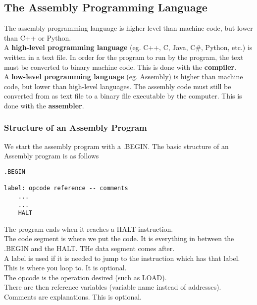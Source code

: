 \documentclass[]{article}
\begin{document}
\subsection{The Assembly Programming Language}
\bigbreak

The assembly programming language is higher level than machine code, but lower than C++ or Python.\\

A \textbf{high-level programming language} (eg. C++, C, Java, C\#, Python, etc.) is written in a text file. In order for the program to run by the program, the text must be converted to binary machine code. This is done with the \textbf{compiler}.\\

A \textbf{low-level programming language} (eg. Assembly) is higher than machine code, but lower than high-level languages. The assembly code must still be converted from as text file to a binary file executable by the computer. This is done with the \textbf{assembler}.\\

\subsubsection{Structure of an Assembly Program}
\bigbreak

We start the assembly program with a .BEGIN. The basic structure of an Assembly program is as follows  \\

\begin{lstlisting}[style=customasm]
.BEGIN

label: opcode reference -- comments
	...
	...
	HALT
\end{lstlisting}\bigbreak

The program ends when it reaches a HALT instruction.\\

The code segment is where we put the code. It is everything in between the .BEGIN and the HALT. THe data segment comes after.\\

A label is used if it is needed to jump to the instruction which has that label. This is where you loop to. It is optional.\\
The opcode is the operation desired (such as LOAD).\\
There are then reference variables (variable name instead of addresses).\\
Comments are explanations. This is optional.
\end{document}
